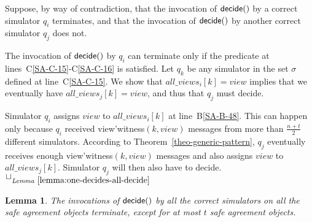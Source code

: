 \documentclass[11pt,letterpaper]{article}
\newtheorem{lemma}{Lemma}
\newlength {\afterproof}
\newcommand{\toto}{xxx}
\newenvironment{proofL}{\noindent{\bf Proof }}
{\hspace*{\fill}$\Box_{\mathit{Lemma}~\ref{\toto}}$\par\vspace{\afterproof}}
\begin{document}
\begin{proofL}
Suppose, by way of contradiction, that the invocation of ${\sf decide}()$
by a correct simulator $q_i$ terminates, and that the invocation of 
${\sf decide}()$ by another correct simulator $q_j$ does not.

The invocation of ${\sf decide}()$ by $q_i$ can terminate only if 
the predicate at lines~C\ref{SA-C-15}-C\ref{SA-C-16} is satisfied.
Let $q_k$ be any simulator in the set $\sigma$ defined at 
line~C\ref{SA-C-15}. We  show that $all\_views_i[k] = view$ implies that 
we  eventually have $all\_views_j[k] = view$, and thus that $q_j$ must 
decide.

Simulator $q_i$ assigns $view$ to $all\_views_i[k]$ at line~B\ref{SA-B-48}. 
This can happen only because $q_i$ received 
{\sc view'witness}$(k,view)$ messages from more than 
$\frac{n+t}{2}$ different simulators. According to 
Theorem~\ref{theo-generic-pattern},  $q_j$  eventually  receives
enough {\sc view'witness}$(k,view)$ messages
and  also assigns $view$ to $all\_views_j[k]$. Simulator
$q_j$ will then also have to decide.
\renewcommand{\toto}{lemma:one-decides-all-decide}
\end{proofL}

\begin{lemma}
\label{lemma:at-most-one-blocked-byz}
The invocations of ${\sf  decide}()$ by all the correct simulators 
on all the safe agreement objects terminate, except for at most $t$
safe agreement objects.
\end{lemma}
\end{document}
